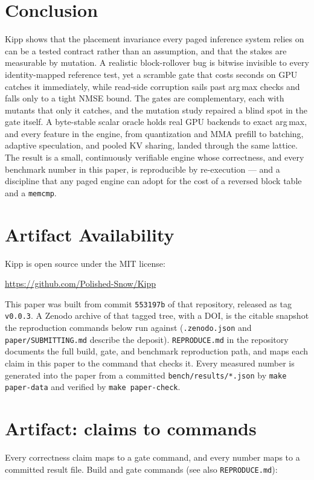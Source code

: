 \documentclass[sigconf,nonacm,screen]{acmart}
\newcommand{\code}[1]{\texttt{\small #1}}
\begin{document}
\section{Conclusion}
Kipp shows that the placement invariance every paged inference system relies
on can be a tested contract rather than an assumption, and that the stakes
are measurable by mutation. A realistic block-rollover bug is bitwise
invisible to every identity-mapped reference test, yet a scramble gate that
costs seconds on GPU catches it immediately, while read-side corruption
sails past arg\,max checks and falls only to a tight NMSE bound. The gates
are complementary, each with mutants that only it catches, and the mutation
study repaired a blind spot in the gate itself. A byte-stable scalar oracle
holds real GPU backends to exact arg\,max, and every feature in the engine,
from quantization and MMA prefill to batching, adaptive speculation, and
pooled KV sharing, landed through the same lattice. The result is a small,
continuously verifiable engine whose correctness, and every benchmark
number in this paper, is reproducible by re-execution --- and a discipline
that any paged engine can adopt for the cost of a reversed block table and
a \code{memcmp}.

\section*{Artifact Availability}
Kipp is open source under the MIT license:\par
\noindent\url{https://github.com/Polished-Snow/Kipp}\par
\noindent This paper was built from commit \texttt{553197b} of that
repository, released as tag \texttt{v0.0.3}. A Zenodo archive of that
tagged tree, with a DOI, is the citable snapshot the reproduction
commands below run against (\code{.zenodo.json} and
\code{paper/SUBMITTING.md} describe the deposit).
\code{REPRODUCE.md} in the repository
documents the full build, gate, and benchmark reproduction path, and
 maps each claim in this paper to the command that checks
it. Every measured number is generated into the paper from a committed
\code{bench/results/*.json} by \code{make paper-data} and verified by
\code{make paper-check}.

\balance



\appendix
\section{Artifact: claims to commands}
\label{app:artifact}
Every correctness claim maps to a gate command, and every number maps to a
committed result file. Build and gate commands (see also
\code{REPRODUCE.md}):
\end{document}
